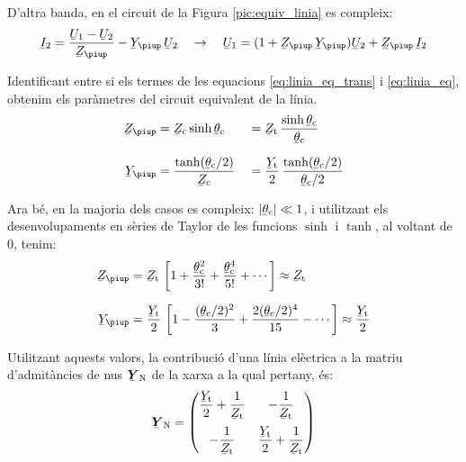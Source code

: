 D'altra banda, en el circuit de la Figura \vref{pic:equiv_linia} es compleix:
\begin{equation}\label{eq:linia_eq}
   \cmplx{I}_2 = \frac{\cmplx{U}_1 - \cmplx{U}_2}{\cmplx{Z}_\piup} - \cmplx{Y}_\piup\, \cmplx{U}_2
   \quad \rightarrow\quad
   \cmplx{U}_1 = (1 + \cmplx{Z}_\piup\,\cmplx{Y}_\piup ) \cmplx{U}_2 + \cmplx{Z}_\piup\,\cmplx{I}_2
\end{equation}

Identificant entre si els termes de les equacions
\eqref{eq:linia_eq_trans} i \eqref{eq:linia_eq}, obtenim els
paràmetres del circuit equivalent de la línia.
\begin{alignat}{2}
   \cmplx{Z}_\piup &= \cmplx{Z}\ped{c} \sinh \cmplx{\theta}\ped{c} &&= \cmplx{Z}\ped{t} \,
   \frac{\sinh \cmplx{\theta}\ped{c}}{\cmplx{\theta}\ped{c}} \\[1.5ex]
   \cmplx{Y}_\piup &= \frac{\tanh (\cmplx{\theta}\ped{c} / 2) }{\cmplx{Z}\ped{c}} &&=
   \frac{\cmplx{Y}\ped{t}}{2} \, \frac{\tanh (\cmplx{\theta}\ped{c} / 2)}{\cmplx{\theta}\ped{c} / 2}
\end{alignat}

Ara bé, en la majoria dels casos es compleix: $|\cmplx{\theta}\ped{c}| \ll 1$, i utilitzant els desenvolupaments en sèries de Taylor de les funcions $\sinh$ i $\tanh$, al voltant de 0, tenim:
\begin{align}
   \cmplx{Z}_\piup &= \cmplx{Z}\ped{t} \, \left[ 1 + \frac{\cmplx{\theta}\ped{c}^2}{3!} +
   \frac{\cmplx{\theta}\ped{c}^4}{5!} + \cdots \right] \approx \cmplx{Z}\ped{t} \\[1.5ex]
   \cmplx{Y}_\piup &= \frac{\cmplx{Y}\ped{t}}{2} \,\left[ 1 - \frac{(\cmplx{\theta}\ped{c}/2)^2}{3} + \frac{2 (\cmplx{\theta}\ped{c}/2)^4}{15} - \cdots \right] \approx \frac{\cmplx{Y}\ped{t}}{2}
\end{align}

Utilitzant aquests valors, la contribució d'una línia elèctrica a
la matriu d'admitàncies de nus $\mcmplx{Y}\ped{N}$ de la xarxa a la
qual pertany, és: 
\begin{equation}
   \mcmplx{Y}\ped{N} = \begin{pmatrix}
     \dfrac{\cmplx{Y}\ped{t}}{2} + \dfrac{1}{\cmplx{Z}\ped{t}} & -\dfrac{1}{\cmplx{Z}\ped{t}}\\[2.5ex]
     -\dfrac{1}{\cmplx{Z}\ped{t}} & \dfrac{\cmplx{Y}\ped{t}}{2} + \dfrac{1}{\cmplx{Z}\ped{t}}
   \end{pmatrix}
\end{equation}

